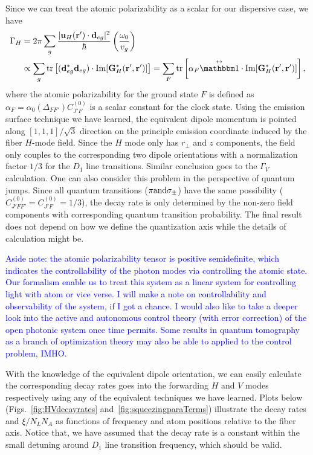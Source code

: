 Since we can treat the atomic polarizability as a scalar for our dispersive case, we have 
\begin{align}
\Gamma_H &= 2\pi \sum_g \frac{|\mathbf{u}_H(\br')\cdot \mathbf{d}_{eg}|^2}{\hbar}\left(\frac{\omega_0}{v_g} \right) \\
&\propto \sum_g \tr \left[(\mathbf{d}_{eg}^*\mathbf{d}_{eg})\cdot \mathrm{Im} [\mathbf{G}_H^*(\br',\br')] \right]  = \sum_F \tr \left[ \alpha_F \eye\cdot \mathrm{Im} [\mathbf{G}_H^*(\br',\br')]  \right],
\end{align}
where the atomic polarizability for the ground state $ F $ is defined as $ \alpha_F=\alpha_0(\Delta_{FF'})C_{J'F}^{(0)} $ is a scalar constant for the clock state. Using the emission surface technique we have learned, the equivalent dipole momentum is pointed along $ [1,1,1]/\sqrt{3} $ direction on the principle emission coordinate induced by the fiber $ H $-mode field. Since the $ H $ mode only has $ r\!_\perp $ and $ z $ components, the field only couples to the corresponding two dipole orientations with a normalization factor $ 1/3 $ for the $ D_1 $ line transitions. Similar conclusion goes to the $ \Gamma_V $ calculation. One can also consider this problem in the perspective of quantum jumps. Since all quantum transitions ($ \pi\rm{ and }\sigma_\pm $) have the same possibility ($C_{J'FF'}^{(0)}=C_{J'F}^{(0)}=1/3 $), the decay rate is only determined by the non-zero field components with corresponding quantum transition probability. The final result does not depend on how we define the quantization axis while the details of calculation might be. 

\textcolor{blue}{Aside note: the atomic polarizability tensor is positive semidefinite, which indicates the controllability of the photon modes via controlling the atomic state. Our formalism enable us to treat this system as a linear system for controlling light with atom or vice verse. I will make a note on controllability and observability of the system, if I got a chance. I would also like to take a deeper look into the active and autonomous control theory (with error correction) of the open photonic system once time permits. Some results in quantum tomography as a branch of optimization theory may also be able to applied to the control problem, IMHO. }

With the knowledge of the equivalent dipole orientation, we can easily calculate the corresponding decay rates goes into the forwarding $ H $ and $ V $ modes respectively using any of the equivalent techniques we have learned. Plots below (Figs.~\ref{fig:HVdecayrates} and~\ref{fig:squeezingparaTerms}) illustrate the decay rates and $ \xi/N_LN_A $ as functions of frequency and atom positions relative to the fiber axis. Notice that, we have assumed that the decay rate is a constant within the small detuning around $ D_1 $ line transition frequency, which should be valid. 

